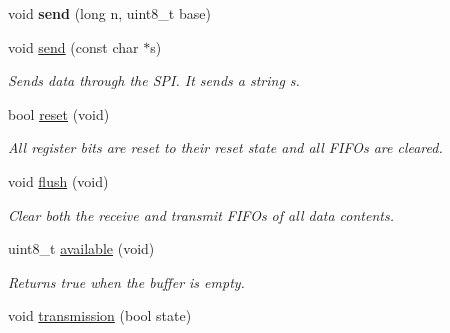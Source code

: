 \begin{DoxyCompactItemize}
\item 
void {\bfseries send} (long n, uint8\+\_\+t base)\hypertarget{class_wasp485_a76bda255cda631701095a058e8479515}{}\label{class_wasp485_a76bda255cda631701095a058e8479515}

\item 
void \hyperlink{class_wasp485_a6770925ccb7ba6f4200766de936e1d76}{send} (const char $\ast$s)\hypertarget{class_wasp485_a6770925ccb7ba6f4200766de936e1d76}{}\label{class_wasp485_a6770925ccb7ba6f4200766de936e1d76}

\begin{DoxyCompactList}\small\item\em Sends data through the S\+PI. It sends a string s. \end{DoxyCompactList}\item 
bool \hyperlink{class_wasp485_a9de7ade8aea967563d440ac01c15612b}{reset} (void)\hypertarget{class_wasp485_a9de7ade8aea967563d440ac01c15612b}{}\label{class_wasp485_a9de7ade8aea967563d440ac01c15612b}

\begin{DoxyCompactList}\small\item\em All register bits are reset to their reset state and all F\+I\+F\+Os are cleared. \end{DoxyCompactList}\item 
void \hyperlink{class_wasp485_afb9ba7ff9a2ca84e10e9aed4f67cf32d}{flush} (void)\hypertarget{class_wasp485_afb9ba7ff9a2ca84e10e9aed4f67cf32d}{}\label{class_wasp485_afb9ba7ff9a2ca84e10e9aed4f67cf32d}

\begin{DoxyCompactList}\small\item\em Clear both the receive and transmit F\+I\+F\+Os of all data contents. \end{DoxyCompactList}\item 
uint8\+\_\+t \hyperlink{class_wasp485_a39fd77232c34c522984a82a7dd415a59}{available} (void)\hypertarget{class_wasp485_a39fd77232c34c522984a82a7dd415a59}{}\label{class_wasp485_a39fd77232c34c522984a82a7dd415a59}

\begin{DoxyCompactList}\small\item\em Returns true when the buffer is empty. \end{DoxyCompactList}\item 
void \hyperlink{class_wasp485_a42202ed7ea7d328f1efc2fd9cbe9d412}{transmission} (bool state)\hypertarget{class_wasp485_a42202ed7ea7d328f1efc2fd9cbe9d412}{}\label{class_wasp485_a42202ed7ea7d328f1efc2fd9cbe9d412}


\end{DoxyCompactItemize}
